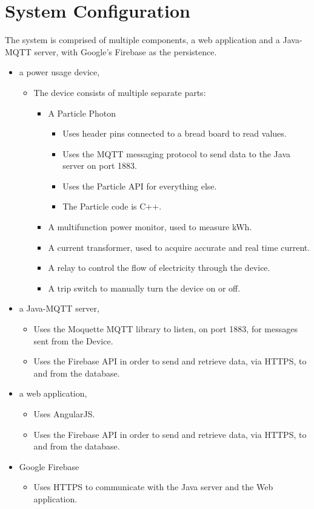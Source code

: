 \documentclass[a4paper,10pt]{article}
\begin{document}
	\section{System Configuration}
	The system is comprised of multiple components, a web application and a Java-MQTT server, with Google's Firebase as the persistence.
	\begin{itemize}
		\item a power usage device,
			\begin{itemize}
				\item The device consists of multiple separate parts:
				\begin{itemize}
				\item A Particle Photon
					\begin{itemize}		
						\item Uses header pins connected to a bread board to read values.
						\item Uses the MQTT messaging protocol to send data to the Java server on port 1883.
						\item Uses the Particle API for everything else.
						\item The Particle code is C++.
					\end{itemize}
				\item A multifunction power monitor, used to measure kWh.
				\item A current transformer, used to acquire accurate and real time current.
				\item A relay to control the flow of electricity through the device.
				\item A trip switch to manually turn the device on or off.
				\end{itemize}					
			\end{itemize}		
		\item a Java-MQTT server,
			\begin{itemize}		
				\item Uses the Moquette MQTT library to listen, on port 1883, for messages sent from the Device.
				\item Uses the Firebase API in order to send and retrieve data, via HTTPS, to and from the database.
			\end{itemize}				
		\item a web application,
			\begin{itemize}		
				\item Uses AngularJS.
				\item Uses the Firebase API in order to send and retrieve data, via HTTPS, to and from the database.
			\end{itemize}				
		\item Google Firebase
			\begin{itemize}
				\item Uses HTTPS to communicate with the Java server and the Web application.
			\end{itemize}
	\end{itemize}
\end{document}
